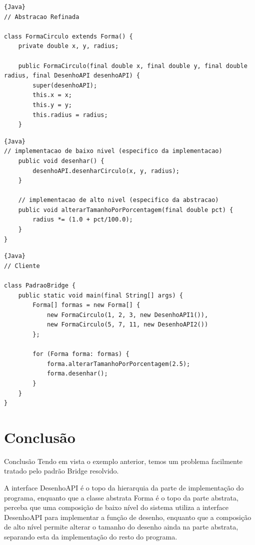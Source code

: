 \documentclass{beamer}
\begin{document}
  \begin{frame}[fragile]
  \begin{lstlisting}{Java}
// Abstracao Refinada

class FormaCirculo extends Forma() {
    private double x, y, radius;

    public FormaCirculo(final double x, final double y, final double radius, final DesenhoAPI desenhoAPI) {
        super(desenhoAPI);
        this.x = x;
        this.y = y;
        this.radius = radius;
    }
    \end{lstlisting}
  \end{frame}

  \begin{frame}[fragile]
  \begin{lstlisting}{Java}
// implementacao de baixo nivel (especifico da implementacao)
    public void desenhar() {
        desenhoAPI.desenharCirculo(x, y, radius);
    }

    // implementacao de alto nivel (especifico da abstracao)
    public void alterarTamanhoPorPorcentagem(final double pct) {
        radius *= (1.0 + pct/100.0);
    }
}
    \end{lstlisting}
  \end{frame}

  \begin{frame}[fragile]
  \begin{lstlisting}{Java}
// Cliente

class PadraoBridge {
    public static void main(final String[] args) {
        Forma[] formas = new Forma[] {
            new FormaCirculo(1, 2, 3, new DesenhoAPI1()),
            new FormaCirculo(5, 7, 11, new DesenhoAPI2())
        };

        for (Forma forma: formas) {
            forma.alterarTamanhoPorPorcentagem(2.5);
            forma.desenhar();
        }
    }
}
    \end{lstlisting}
  \end{frame}
  
\section{Conclusão}  
  
\begin{frame}{Conclusão}
	Tendo em vista o exemplo anterior, temos um problema facilmente tratado pelo padrão Bridge resolvido. 
	
	A interface DesenhoAPI é o topo da hierarquia da parte de implementação do programa, enquanto que a classe abstrata Forma é o topo da parte abstrata, perceba que uma composição de baixo nível do sistema utiliza a interface DesenhoAPI para implementar a função de desenho, enquanto que a composição de alto nível permite alterar o tamanho do desenho ainda na parte abstrata, separando esta da implementação do resto do programa.
\end{frame}
\end{document}
